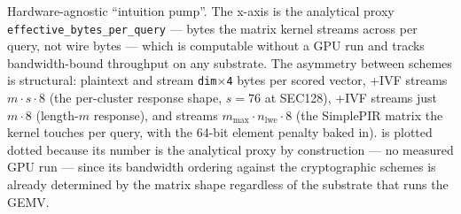 Hardware-agnostic ``intuition pump''. The x-axis is the analytical
proxy \texttt{effective\_bytes\_per\_query} --- bytes the matrix
kernel streams across per query, not wire bytes --- which is
computable without a GPU run and tracks bandwidth-bound throughput
on any substrate. The asymmetry between schemes is structural:
plaintext and \sap stream \texttt{dim$\times$4} bytes per scored
vector, \emvp+IVF streams \texttt{$m\cdot s\cdot8$} (the per-cluster
response shape, $s=76$ at SEC128), \bntm+IVF streams just
\texttt{$m\cdot8$} (length-$m$ response), and \tiptoe streams
\texttt{$m_{\max}\cdot n_{\text{lwe}}\cdot8$} (the SimplePIR matrix
the kernel touches per query, with the 64-bit element penalty
baked in). \tiptoe is plotted dotted because its number is the
analytical proxy by construction --- no measured GPU run --- since
its bandwidth ordering against the cryptographic schemes is
already determined by the matrix shape regardless of the substrate
that runs the GEMV.
